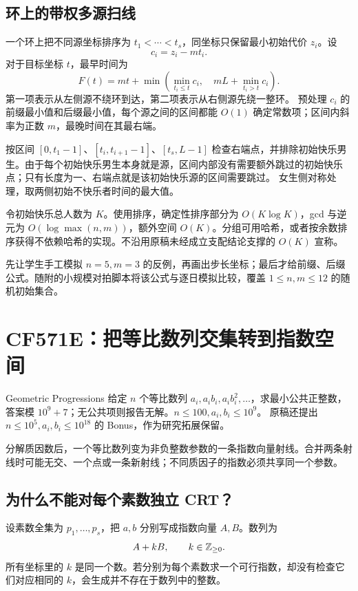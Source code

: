 \subsection{环上的带权多源扫线}
一个环上把不同源坐标排序为 $t_1<\cdots<t_s$，同坐标只保留最小初始代价 $z_i$。设
\[
 c_i=z_i-mt_i.
\]
对于目标坐标 $t$，最早时间为
\[
 F(t)=mt+\min\left(
 \min_{t_i\le t}c_i,\quad
 mL+\min_{t_i>t}c_i\right).
\]
第一项表示从左侧源不绕环到达，第二项表示从右侧源先绕一整环。
预处理 $c_i$ 的前缀最小值和后缀最小值，每个源之间的区间都能 $O(1)$ 确定常数项；区间内斜率为正数 $m$，最晚时间在其最右端。

按区间 $[0,t_1-1]$、$[t_i,t_{i+1}-1]$、$[t_s,L-1]$ 检查右端点，并排除初始快乐男生。由于每个初始快乐男生本身就是源，区间内部没有需要额外跳过的初始快乐点；只有长度为一、右端点就是该初始快乐源的区间需要跳过。
女生侧对称处理，取两侧初始不快乐者时间的最大值。

\cost 令初始快乐总人数为 $K$。使用排序，确定性排序部分为 $O(K\log K)$，gcd 与逆元为 $O(\log\max(n,m))$，额外空间 $O(K)$。分组可用哈希，或者按余数排序获得不依赖哈希的实现。不沿用原稿未经成立支配结论支撑的 $O(K)$ 宣称。
\begin{teach}[备课验证]
先让学生手工模拟 $n=5,m=3$ 的反例，再画出步长坐标；最后才给前缀、后缀公式。随附的小规模对拍脚本将该公式与逐日模拟比较，覆盖 $1\le n,m\le12$ 的随机初始集合。
\end{teach}


\section{CF571E：把等比数列交集转到指数空间}
\begin{problem}{Geometric Progressions}
给定 $n$ 个等比数列 $a_i,a_ib_i,a_ib_i^2,\ldots$，求最小公共正整数，答案模 $10^9+7$；无公共项则报告无解。$n\le100,a_i,b_i\le10^9$。
原稿还提出 $n\le10^5,a_i,b_i\le10^{18}$ 的 Bonus，作为研究拓展保留。
\end{problem}
\hint 分解质因数后，一个等比数列变为非负整数参数的一条指数向量射线。合并两条射线时可能无交、一个点或一条新射线；不同质因子的指数必须共享同一个参数。

\subsection{为什么不能对每个素数独立 CRT？}
设素数全集为 $p_1,\ldots,p_s$，把 $a,b$ 分别写成指数向量 $A,B$。数列为
\[
 A+kB,\qquad k\in\mathbb Z_{\ge0}.
\]
所有坐标里的 $k$ 是同一个数。若分别为每个素数求一个可行指数，却没有检查它们对应相同的 $k$，会生成并不存在于数列中的整数。

